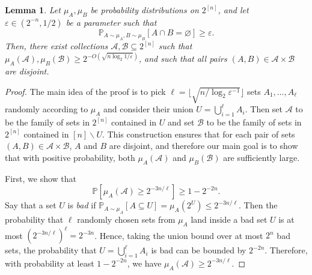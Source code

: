 \documentclass[11pt]{amsart}
\newtheorem{lemma}[theorem]{\bf Lemma}
\theoremstyle{definition}
\def\eps{\varepsilon}
\def\cA{\mathcal{A}}
\def\cB{\mathcal{B}}
\def\Pb{\mathbb{P}}
\begin{document}
\begin{lemma}\label{lemma:main}
Let $\mu_A, \mu_B$ be probability distributions on $2^{[n]}$, and let $\eps\in (2^{-n}, 1/2)$ be a parameter such that  \[\Pb_{A\sim \mu_A, B\sim \mu_B}[A\cap B=\varnothing]\geq \eps.\] Then, there exist collections $\cA, \cB\subseteq 2^{[n]}$ such that $\mu_{A}(\cA), \mu_B(\cB)\geq 2^{-O(\sqrt{n\log_2 1/\eps})}$, and such that all pairs $(A, B)\in \cA\times \cB$ are disjoint.
\end{lemma}
\begin{proof}
The main idea of the proof is to pick $\ell=\lfloor \sqrt{n/\log_2\eps^{-1}}\rfloor$ sets $A_1, \dots, A_\ell$ randomly according to $\mu_A$ and consider their union $U=\bigcup_{i=1}^\ell A_i$. Then set $\cA$ to be the family of sets in $2^{[n]}$ contained in $U$ and set $\cB$ to be the family of sets in $2^{[n]}$ contained in $[n]\backslash U$. This construction ensures that for each pair of sets $(A,B)\in \cA\times \cB$, $A$ and $B$ are disjoint, and therefore our main goal is to show that with positive probability, both $\mu_A(\cA)$ and $\mu_B(\cB)$ are sufficiently large.

First, we show that \[\Pb[\mu_A(\cA)\geq 2^{-3n/\ell}]\geq 1-2^{-2n}.\] Say that a set $U$ is \textit{bad} if $\Pb_{A\sim \mu_A}[A\subseteq U]=\mu_A(2^U)\leq 2^{-3n/\ell}$. Then the probability that $\ell$ randomly chosen sets from $\mu_A$ land inside a bad set $U$ is at most $(2^{-3n/\ell})^\ell=2^{-3n}$. Hence, taking the union bound over at most $2^n$ bad sets, the probability that $U=\bigcup_{i=1}^\ell A_i$ is bad can be bounded by $2^{-2n}$. Therefore, with probability at least $1-2^{-2n}$, we have $\mu_A(\cA)\geq 2^{-3n/\ell}$.


\end{proof}
\end{document}

